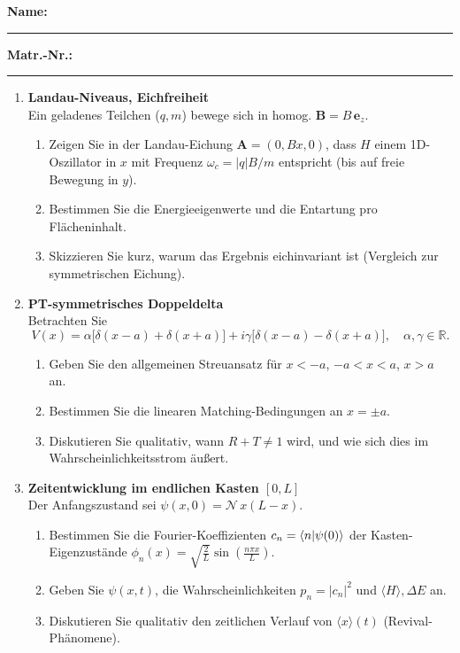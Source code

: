 \documentclass[11pt,a4paper]{article}
\begin{document}
\noindent\textbf{Name:} \rule{0.6\linewidth}{0.4pt}\hfill\textbf{Matr.-Nr.:} \rule{0.25\linewidth}{0.4pt}
\vspace{1em}
\begin{enumerate}

\item \textbf{Landau-Niveaus, Eichfreiheit}\\
Ein geladenes Teilchen (\(q,m\)) bewege sich in homog. \(\mathbf B=B\,\mathbf e_z\).
\begin{enumerate}
  \item Zeigen Sie in der Landau-Eichung \(\mathbf A=(0,Bx,0)\), dass \(H\) einem 1D-Oszillator in \(x\) mit Frequenz \(\omega_c=|q|B/m\) entspricht (bis auf freie Bewegung in \(y\)).
  \item Bestimmen Sie die Energieeigenwerte und die Entartung pro Flächeninhalt.
  \item Skizzieren Sie kurz, warum das Ergebnis eichinvariant ist (Vergleich zur symmetrischen Eichung).
\end{enumerate}

\item \textbf{PT-symmetrisches Doppeldelta}\\
Betrachten Sie
\[
V(x)=\alpha\bigl[\delta(x-a)+\delta(x+a)\bigr]+ i\gamma\bigl[\delta(x-a)-\delta(x+a)\bigr],\quad \alpha,\gamma\in\mathbb R.
\]
\begin{enumerate}
  \item Geben Sie den allgemeinen Streuansatz für \(x< -a\), \(-a<x<a\), \(x>a\) an.
  \item Bestimmen Sie die linearen Matching-Bedingungen an \(x=\pm a\).
  \item Diskutieren Sie qualitativ, wann \(R+T\neq1\) wird, und wie sich dies im Wahrscheinlichkeitsstrom äußert.
\end{enumerate}

\item \textbf{Zeitentwicklung im endlichen Kasten \([0,L]\)}\\
Der Anfangszustand sei
\(\displaystyle \psi(x,0)=\mathcal N\,x(L-x)\).
\begin{enumerate}
  \item Bestimmen Sie die Fourier-Koeffizienten \(c_n=\braket{n|\psi(0)}\) der Kasten-Eigenzustände \(\phi_n(x)=\sqrt{\tfrac{2}{L}}\sin(\tfrac{n\pi x}{L})\).
  \item Geben Sie \(\psi(x,t)\), die Wahrscheinlichkeiten \(p_n=|c_n|^2\) und \(\langle H\rangle,\Delta E\) an.
  \item Diskutieren Sie qualitativ den zeitlichen Verlauf von \(\langle x\rangle(t)\) (Revival-Phänomene).
\end{enumerate}


\end{enumerate}
\end{document}
